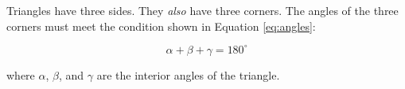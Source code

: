 \documentclass[a4paper,12pt]{article}
\begin{document}
Triangles have three sides. They \emph{also} have three corners. 
The angles of the three corners must meet the condition
shown in Equation \ref{eq:angles}:

\begin{equation} \label{eq:angles}
\alpha+\beta+\gamma=180^{\circ}
\end{equation}

\noindent where $\alpha$, $\beta$, and $\gamma$ are the interior angles of the triangle.
\end{document}
